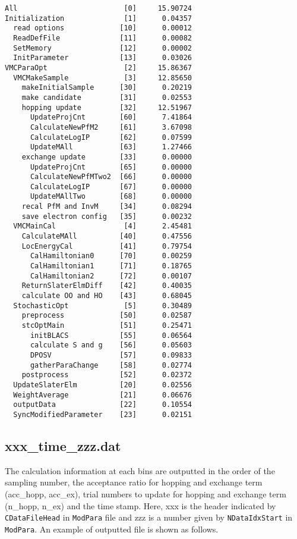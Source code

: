 \begin{minipage}{15.5cm}
\begin{screen}
\begin{verbatim}
All                         [0]     15.90724
Initialization              [1]      0.04357
  read options             [10]      0.00012
  ReadDefFile              [11]      0.00082
  SetMemory                [12]      0.00002
  InitParameter            [13]      0.03026
VMCParaOpt                  [2]     15.86367
  VMCMakeSample             [3]     12.85650
    makeInitialSample      [30]      0.20219
    make candidate         [31]      0.02553
    hopping update         [32]     12.51967
      UpdateProjCnt        [60]      7.41864
      CalculateNewPfM2     [61]      3.67098
      CalculateLogIP       [62]      0.07599
      UpdateMAll           [63]      1.27466
    exchange update        [33]      0.00000
      UpdateProjCnt        [65]      0.00000
      CalculateNewPfMTwo2  [66]      0.00000
      CalculateLogIP       [67]      0.00000
      UpdateMAllTwo        [68]      0.00000
    recal PfM and InvM     [34]      0.08294
    save electron config   [35]      0.00232
  VMCMainCal                [4]      2.45481
    CalculateMAll          [40]      0.47556
    LocEnergyCal           [41]      0.79754
      CalHamiltonian0      [70]      0.00259
      CalHamiltonian1      [71]      0.18765
      CalHamiltonian2      [72]      0.00107
    ReturnSlaterElmDiff    [42]      0.40035
    calculate OO and HO    [43]      0.68045
  StochasticOpt             [5]      0.30489
    preprocess             [50]      0.02587
    stcOptMain             [51]      0.25471
      initBLACS            [55]      0.06564
      calculate S and g    [56]      0.05603
      DPOSV                [57]      0.09833
      gatherParaChange     [58]      0.02774
    postprocess            [52]      0.02372
  UpdateSlaterElm          [20]      0.02556
  WeightAverage            [21]      0.06676
  outputData               [22]      0.10554
  SyncModifiedParameter    [23]      0.02151\end{verbatim}
\end{screen}
\end{minipage}


\newpage
\subsection{xxx\_time\_zzz.dat }
\label{subsec:time}
The calculation information at each bins are outputted in the order of the sampling number, the acceptance ratio for hopping and exchange term (acc\_hopp, acc\_ex), trial numbers to update for hopping and exchange term (n\_hopp, n\_ex) and the time stamp.
Here, xxx is the header indicated by \verb|CDataFileHead| in \verb|ModPara| file and zzz is a number given by \verb|NDataIdxStart| in \verb|ModPara|.
An example of outputted file is shown as follows.

